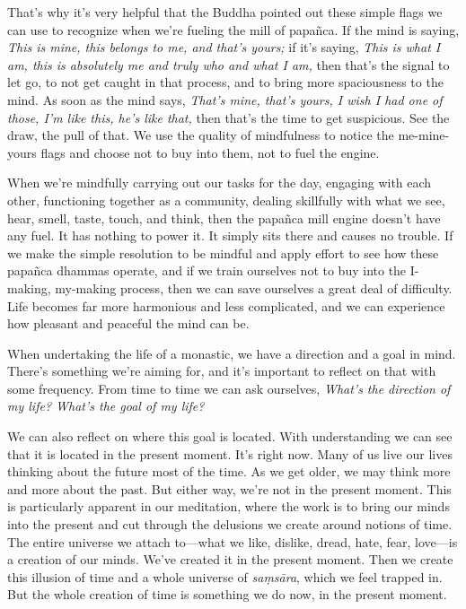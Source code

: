 That's why it's very helpful that the Buddha pointed out these simple 
flags we can use to recognize when we're fueling the mill of papañca. 
If the mind is saying, \emph{This is mine, this belongs to me, and 
that's yours;} if it's saying, \emph{This is what I am, this is 
absolutely me and truly who and what I am,} then that's the signal to 
let go, to not get caught in that process, and to bring more 
spaciousness to the mind. As soon as the mind says, \emph{That's mine, 
that's yours, I wish I had one of those, I'm like this, he's like 
that,} then that's the time to get suspicious. See the draw, the pull 
of that. We use the quality of mindfulness to notice the me-mine-yours 
flags and choose not to buy into them, not to fuel the engine.

When we're mindfully carrying out our tasks for the day, engaging with 
each other, functioning together as a community, dealing skillfully 
with what we see, hear, smell, taste, touch, and think, then the 
papañca mill engine doesn't have any fuel. It has nothing to power it. 
It simply sits there and causes no trouble. If we make the simple 
resolution to be mindful and apply effort to see how these papañca 
dhammas operate, and if we train ourselves not to buy into the 
I-making, my-making process, then we can save ourselves a great deal of 
difficulty. Life becomes far more harmonious and less complicated, and 
we can experience how pleasant and peaceful the mind can be.


When undertaking the life of a monastic, we have a direction and a goal 
in mind. There's something we're aiming for, and it's important to 
reflect on that with some frequency. From time to time we can ask 
ourselves, \emph{What's the direction of my life? What's the goal of my 
life?}

We can also reflect on where this goal is located. With understanding 
we can see that it is located in the present moment. It's right now. 
Many of us live our lives thinking about the future most of the time. 
As we get older, we may think more and more about the past. But either 
way, we're not in the present moment. This is particularly apparent in 
our meditation, where the work is to bring our minds into the present 
and cut through the delusions we create around notions of time. The 
entire universe we attach to---what we like, dislike, dread, hate, 
fear, love---is a creation of our minds. We've created it in the 
present moment. Then we create this illusion of time and a whole 
universe of \emph{saṃsāra}, which we feel trapped in. But the whole 
creation of time is something we do now, in the present moment.

